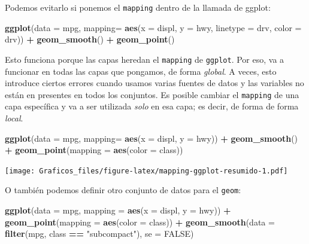 \documentclass[]{book}
\newenvironment{Shaded}{\begin{snugshade}}{\end{snugshade}}
\newcommand{\DataTypeTok}[1]{\textcolor[rgb]{0.13,0.29,0.53}{#1}}
\newcommand{\KeywordTok}[1]{\textcolor[rgb]{0.13,0.29,0.53}{\textbf{#1}}}
\newcommand{\NormalTok}[1]{#1}
\newcommand{\OperatorTok}[1]{\textcolor[rgb]{0.81,0.36,0.00}{\textbf{#1}}}
\newcommand{\OtherTok}[1]{\textcolor[rgb]{0.56,0.35,0.01}{#1}}
\newcommand{\StringTok}[1]{\textcolor[rgb]{0.31,0.60,0.02}{#1}}
\theoremstyle{definition}
\theoremstyle{definition}
\theoremstyle{definition}
\theoremstyle{remark}
\begin{document}
Podemos evitarlo si ponemos el \texttt{mapping} dentro de la llamada de
ggplot:

\begin{Shaded}
\begin{Highlighting}[]
\KeywordTok{ggplot}\NormalTok{(}\DataTypeTok{data =}\NormalTok{ mpg, }\DataTypeTok{mapping=}  \KeywordTok{aes}\NormalTok{(}\DataTypeTok{x =}\NormalTok{ displ, }\DataTypeTok{y =}\NormalTok{ hwy, }\DataTypeTok{linetype =}\NormalTok{ drv, }\DataTypeTok{color =}\NormalTok{ drv)) }\OperatorTok{+}\StringTok{ }
\StringTok{  }\KeywordTok{geom_smooth}\NormalTok{() }\OperatorTok{+}
\StringTok{  }\KeywordTok{geom_point}\NormalTok{()}
\end{Highlighting}
\end{Shaded}

Esto funciona porque las capas heredan el \texttt{mapping} de
\texttt{ggplot}. Por eso, va a funcionar en todas las capas que
pongamos, de forma \emph{global}. A veces, esto introduce ciertos
errores cuando usamos varias fuentes de datos y las variables no están
en presentes en todos los conjuntos. Es posible cambiar el
\texttt{mapping} de una capa específica y va a ser utilizada \emph{solo}
en esa capa; es decir, de forma de forma \emph{local}.

\begin{Shaded}
\begin{Highlighting}[]
\KeywordTok{ggplot}\NormalTok{(}\DataTypeTok{data =}\NormalTok{ mpg, }\DataTypeTok{mapping=}  \KeywordTok{aes}\NormalTok{(}\DataTypeTok{x =}\NormalTok{ displ, }\DataTypeTok{y =}\NormalTok{ hwy)) }\OperatorTok{+}\StringTok{ }
\StringTok{  }\KeywordTok{geom_smooth}\NormalTok{() }\OperatorTok{+}
\StringTok{  }\KeywordTok{geom_point}\NormalTok{(}\DataTypeTok{mapping =} \KeywordTok{aes}\NormalTok{(}\DataTypeTok{color =}\NormalTok{ class))}
\end{Highlighting}
\end{Shaded}

\texttt{[image: Graficos\_files/figure-latex/mapping-ggplot-resumido-1.pdf]}

O también podemos definir otro conjunto de datos para el \texttt{geom}:

\begin{Shaded}
\begin{Highlighting}[]
\KeywordTok{ggplot}\NormalTok{(}\DataTypeTok{data =}\NormalTok{ mpg, }\DataTypeTok{mapping =} \KeywordTok{aes}\NormalTok{(}\DataTypeTok{x =}\NormalTok{ displ, }\DataTypeTok{y =}\NormalTok{ hwy)) }\OperatorTok{+}\StringTok{ }
\StringTok{  }\KeywordTok{geom_point}\NormalTok{(}\DataTypeTok{mapping =} \KeywordTok{aes}\NormalTok{(}\DataTypeTok{color =}\NormalTok{ class)) }\OperatorTok{+}\StringTok{ }
\StringTok{  }\KeywordTok{geom_smooth}\NormalTok{(}\DataTypeTok{data =} \KeywordTok{filter}\NormalTok{(mpg, class }\OperatorTok{==}\StringTok{ "subcompact"}\NormalTok{), }\DataTypeTok{se =} \OtherTok{FALSE}\NormalTok{)}
\end{Highlighting}
\end{Shaded}
\end{document}
